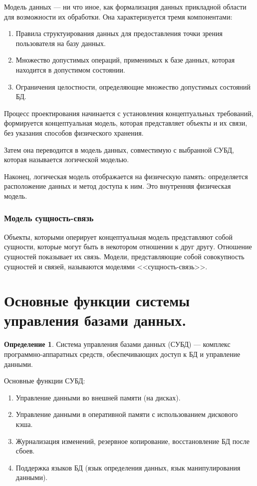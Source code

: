 \documentclass[12pt]{report}
\theoremstyle{definition}
\newtheorem{definition}[theorem]{Определение}
\begin{document}
Модель данных --- ни что иное, как формализация данных
прикладной области для возможности их обработки.
Она характеризуется тремя компонентами:
\begin{enumerate}
\item Правила структуирования данных для предоставления точки зрения пользователя
  на базу данных.
\item Множество допустимых операций, применимых к базе данных, которая находится
  в допустимом состоянии.
\item Ограничения целостности, определяющие множество допустимых состояний БД.
\end{enumerate}

Процесс проектирования начинается с установления концептуальных требований,
формируется концептуальная модель, которая представляет объекты и их связи,
без указания способов физического хранения.

Затем она переводится в модель данных, совместимую с выбранной СУБД, которая
называется логической моделью.

Наконец, логическая модель отображается на физическую память: определяется
расположение данных и метод доступа к ним. Это внутренняя физическая модель.

\subsubsection{Модель сущность-связь}
Объекты, которыми оперирует концептуальная модель
представляют собой сущности, которые могут быть в некотором
отношении к друг другу. Отношение сущностей показывает их связь.
Модели, представляющие собой совокупность сущностей и связей, называются
моделями <<сущность-связь>>.


\section{Основные функции системы управления базами данных.}

\begin{definition}
Система управления базами данных (СУБД) --- комплекс программно-аппаратных
средств, обеспечивающих доступ к БД и управление данными.
\end{definition}

Основные функции СУБД:
\begin{enumerate}
\item Управление данными во внешней памяти (на дисках).
\item Управление данными в оперативной памяти с использованием дискового кэша.
\item Журнализация изменений, резервное копирование, восстановление БД после
  сбоев.
\item Поддержка языков БД (язык определения данных, язык манипулирования данными).
\end{enumerate}
\end{document}

